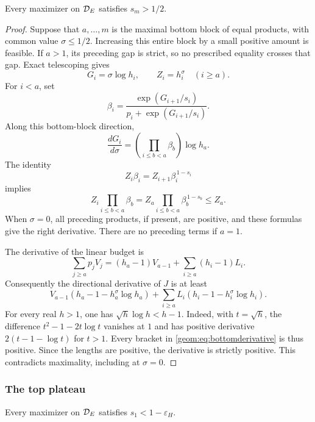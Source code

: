 \begin{lemma}\label{geom:lem:bottom}
Every maximizer on \(\mathcal D_E\) satisfies \(s_m>1/2\).
\end{lemma}

\begin{proof}
Suppose that \(a,\ldots,m\) is the maximal bottom block of equal
products, with common value \(\sigma\le1/2\).  Increasing this entire
block by a small positive amount is feasible.  If \(a>1\), its preceding
gap is strict, so no prescribed equality crosses that gap.  Exact
telescoping gives
\[
 G_i=\sigma\log h_i,\qquad Z_i=h_i^\sigma\quad(i\ge a).
\]
For \(i<a\), set
\[
 \beta_i=\frac{\exp(G_{i+1}/s_i)}
                    {p_i+\exp(G_{i+1}/s_i)}.
\]
Along this bottom-block direction,
\[
 \frac{dG_i}{d\sigma}
   =\left(\prod_{i\le b<a}\beta_b\right)\log h_a.
\]
The identity
\[
 Z_i\beta_i=Z_{i+1}\beta_i^{\,1-s_i}
\]
implies
\[
 Z_i\prod_{i\le b<a}\beta_b
   = Z_a\prod_{i\le b<a}\beta_b^{\,1-s_b}\le Z_a.
\]
When \(\sigma=0\), all preceding products, if present, are positive,
and these formulas give the right derivative.  There are no preceding
terms if \(a=1\).

The derivative of the linear budget is
\[
 \sum_{j\ge a}p_jV_j
   =(h_a-1)V_{a-1}+\sum_{i\ge a}(h_i-1)L_i.
\]
Consequently the directional derivative of \(J\) is at least
\begin{equation}
 V_{a-1}(h_a-1-h_a^\sigma\log h_a)
       +\sum_{i\ge a}L_i(h_i-1-h_i^\sigma\log h_i). \label{geom:eq:bottomderivative}
\end{equation}
For every real \(h>1\), one has \(\sqrt h\log h<h-1\).
Indeed, with \(t=\sqrt h\), the difference
\(t^2-1-2t\log t\) vanishes at \(1\) and has positive derivative
\(2(t-1-\log t)\) for \(t>1\).
Every bracket in \eqref{geom:eq:bottomderivative} is thus positive.
Since the lengths are positive, the derivative is strictly positive.
This contradicts maximality, including at \(\sigma=0\).
\end{proof}

\subsubsection{The top plateau}

\begin{lemma}\label{geom:lem:top}
Every maximizer on \(\mathcal D_E\) satisfies \(s_1<1-\varepsilon_H\).
\end{lemma}

